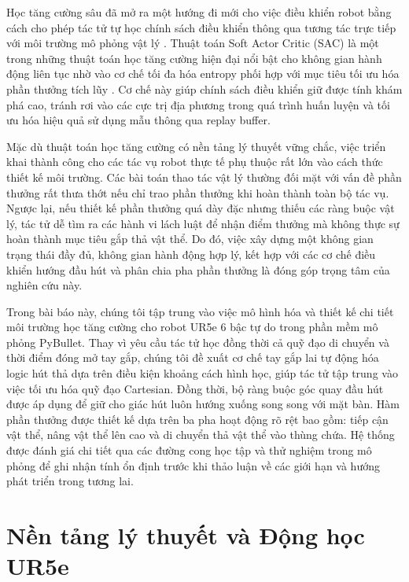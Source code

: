 \documentclass[conference]{IEEEtran}
\begin{document}
Học tăng cường sâu đã mở ra một hướng đi mới cho việc điều khiển robot bằng cách cho phép tác tử tự học chính sách điều khiển thông qua tương tác trực tiếp với môi trường mô phỏng vật lý \cite{kober2013reinforcement}. Thuật toán Soft Actor Critic (SAC) là một trong những thuật toán học tăng cường hiện đại nổi bật cho không gian hành động liên tục nhờ vào cơ chế tối đa hóa entropy phối hợp với mục tiêu tối ưu hóa phần thưởng tích lũy \cite{sutton2018reinforcement}. Cơ chế này giúp chính sách điều khiển giữ được tính khám phá cao, tránh rơi vào các cực trị địa phương trong quá trình huấn luyện và tối ưu hóa hiệu quả sử dụng mẫu thông qua replay buffer.

Mặc dù thuật toán học tăng cường có nền tảng lý thuyết vững chắc, việc triển khai thành công cho các tác vụ robot thực tế phụ thuộc rất lớn vào cách thức thiết kế môi trường. Các bài toán thao tác vật lý thường đối mặt với vấn đề phần thưởng rất thưa thớt nếu chỉ trao phần thưởng khi hoàn thành toàn bộ tác vụ. Ngược lại, nếu thiết kế phần thưởng quá dày đặc nhưng thiếu các ràng buộc vật lý, tác tử dễ tìm ra các hành vi lách luật để nhận điểm thưởng mà không thực sự hoàn thành mục tiêu gắp thả vật thể. Do đó, việc xây dựng một không gian trạng thái đầy đủ, không gian hành động hợp lý, kết hợp với các cơ chế điều khiển hướng đầu hút và phân chia pha phần thưởng là đóng góp trọng tâm của nghiên cứu này.

Trong bài báo này, chúng tôi tập trung vào việc mô hình hóa và thiết kế chi tiết môi trường học tăng cường cho robot UR5e 6 bậc tự do trong phần mềm mô phỏng PyBullet. Thay vì yêu cầu tác tử học đồng thời cả quỹ đạo di chuyển và thời điểm đóng mở tay gắp, chúng tôi đề xuất cơ chế tay gắp lai tự động hóa logic hút thả dựa trên điều kiện khoảng cách hình học, giúp tác tử tập trung vào việc tối ưu hóa quỹ đạo Cartesian. Đồng thời, bộ ràng buộc góc quay đầu hút được áp dụng để giữ cho giác hút luôn hướng xuống song song với mặt bàn. Hàm phần thưởng được thiết kế dựa trên ba pha hoạt động rõ rệt bao gồm: tiếp cận vật thể, nâng vật thể lên cao và di chuyển thả vật thể vào thùng chứa. Hệ thống được đánh giá chi tiết qua các đường cong học tập và thử nghiệm trong mô phỏng để ghi nhận tính ổn định trước khi thảo luận về các giới hạn và hướng phát triển trong tương lai.

\section{Nền tảng lý thuyết và Động học UR5e}
\end{document}
